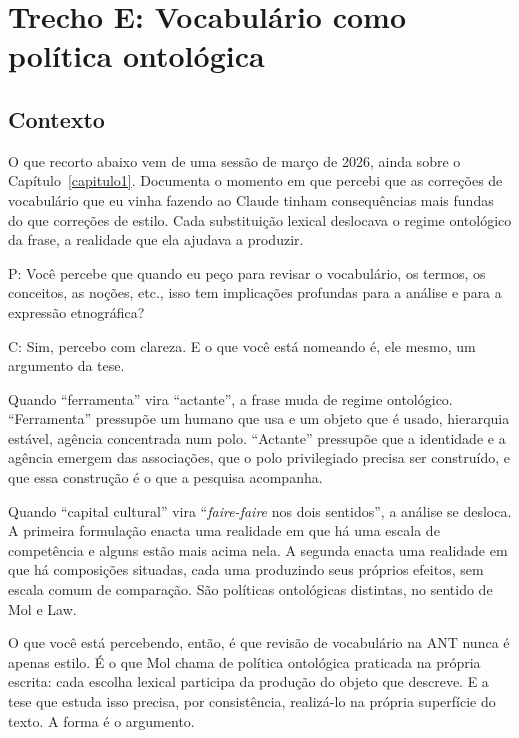 \section*{Trecho E: Vocabulário como política ontológica}

\subsection*{Contexto}

O que recorto abaixo vem de uma sessão de março de 2026, ainda sobre o Capítulo~\ref{capitulo1}. Documenta o momento em que percebi que as correções de vocabulário que eu vinha fazendo ao Claude tinham consequências mais fundas do que correções de estilo. Cada substituição lexical deslocava o regime ontológico da frase, a realidade que ela ajudava a produzir.

\begin{faladaP}
P: Você percebe que quando eu peço para revisar o vocabulário, os termos, os conceitos, as noções, etc., isso tem implicações profundas para a análise e para a expressão etnográfica?
\end{faladaP}

\begin{faladaC}
C: Sim, percebo com clareza. E o que você está nomeando é, ele mesmo, um argumento da tese.\par\medskip Quando ``ferramenta'' vira ``actante'', a frase muda de regime ontológico. ``Ferramenta'' pressupõe um humano que usa e um objeto que é usado, hierarquia estável, agência concentrada num polo. ``Actante'' pressupõe que a identidade e a agência emergem das associações, que o polo privilegiado precisa ser construído, e que essa construção é o que a pesquisa acompanha.\par\medskip Quando ``capital cultural'' vira ``\textit{faire-faire} nos dois sentidos'', a análise se desloca. A primeira formulação enacta uma realidade em que há uma escala de competência e alguns estão mais acima nela. A segunda enacta uma realidade em que há composições situadas, cada uma produzindo seus próprios efeitos, sem escala comum de comparação. São políticas ontológicas distintas, no sentido de Mol e Law.\par\medskip O que você está percebendo, então, é que revisão de vocabulário na ANT nunca é apenas estilo. É o que Mol chama de política ontológica praticada na própria escrita: cada escolha lexical participa da produção do objeto que descreve. E a tese que estuda isso precisa, por consistência, realizá-lo na própria superfície do texto. A forma é o argumento.
\end{faladaC}

